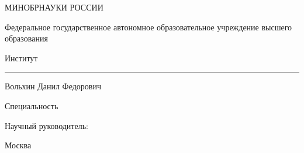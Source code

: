 \begin{frame}[plain,t]
\centering
\vspace{4mm}
{\fontsize{14}{16.8}\selectfont МИНОБРНАУКИ РОССИИ\par
\vspace{4mm}
Федеральное государственное автономное образовательное учреждение высшего образования\par
\InstitutionName\par}
\vspace{5mm}
{Институт \rule{7cm}{0.3pt}\par}
\vspace{14mm}
{\fontsize{24}{28.8}\selectfont Вольхин Данил Федорович\par}
\vspace{8mm}
{\fontsize{16}{19.2}\selectfont\DocumentStatus\par
Специальность \SpecialtyName\par}
\vspace{10mm}
{\fontsize{24}{28.8}\selectfont\bfseries\WorkingTitle\par}
\vfill
{\raggedleft Научный руководитель: \SupervisorName\par}
\vspace{9mm}
{Москва \DocumentYear\par}
\end{frame}
